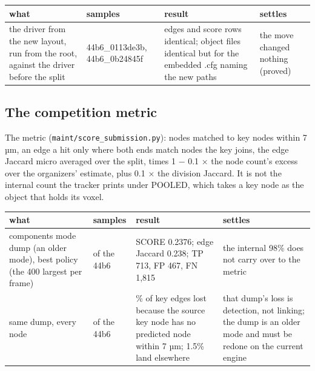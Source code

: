 {\footnotesize
\setlength{\tabcolsep}{6pt}
\begin{longtable}{>{\RaggedRight\arraybackslash}p{}>{\RaggedRight\arraybackslash}p{}>{\RaggedRight\arraybackslash}p{}>{\RaggedRight\arraybackslash}p{}}
\toprule
what & samples & result & settles \\
\midrule
\endhead
the driver from the new layout, run from the root, against the driver before the split & 44b6\_\allowbreak{}0113de3b, 44b6\_\allowbreak{}0b24845f & edges and score rows identical; object files identical but for the embedded .cfg naming the new paths & the move changed nothing (proved) \\
\bottomrule
\end{longtable}
}

\subsection{\texorpdfstring{The competition metric}{The competition metric}}

The metric (\texttt{maint/\allowbreak{}score\_\allowbreak{}submission.\allowbreak{}py}): nodes matched to key nodes within 7 µm, an edge a hit only where both ends match nodes the key joins, the edge Jaccard micro averaged over the split, times 1 − 0.1 × the node count's excess over the organizers' estimate, plus 0.1 × the division Jaccard. It is not the internal count the tracker prints under POOLED, which takes a key node as the object that holds its voxel.

{\footnotesize
\setlength{\tabcolsep}{6pt}
\begin{longtable}{>{\RaggedRight\arraybackslash}p{}>{\RaggedRight\arraybackslash}p{}>{\RaggedRight\arraybackslash}p{}>{\RaggedRight\arraybackslash}p{}}
\toprule
what & samples & result & settles \\
\midrule
\endhead
components mode dump (an older mode), best policy (the 400 largest per frame) & 13 of the 44b6 & SCORE 0.2376; edge Jaccard 0.238; TP 713, FP 467, FN 1,815 & the internal 98\% does not carry over to the metric \\
same dump, every node & 13 of the 44b6 & 60.4\% of key edges lost because the source key node has no predicted node within 7 µm; 1.5\% land elsewhere & that dump's loss is detection, not linking; the dump is an older mode and must be redone on the current engine \\
\bottomrule
\end{longtable}
}

